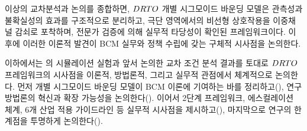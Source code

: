 
\bigskip
이상의 교차분석과 논의를 종합하면, $DRTO$ 개별 시그모이드 바운딩 모델은
관측성과 불확실성의 효과를 구조적으로 분리하고, 극단 영역에서의
비선형 상호작용을 이중채널 감쇠로 포착하며,
전문가 검증에 의해 실무적 타당성이 확인된 프레임워크이다.
이후에 이러한 이론적 발견이 BCM 실무와 정책 수립에 갖는
구체적 시사점을 논의한다.



이하에서는 의 시뮬레이션 실험과 앞서 논의한 교차 조건 분석 결과를
토대로 $DRTO$ 프레임워크의 시사점을 이론적, 방법론적, 그리고 실무적 관점에서
체계적으로 논의한다. 먼저 개별 시그모이드 바운딩 모델이 BCM 이론에
기여하는 바를 정리하고(),
연구 방법론의 혁신과 확장 가능성을 논의한다().
이어서 2단계 프레임워크, 에스컬레이션 체계, 6개 산업 적용 가이드라인 등
실무적 시사점을 제시하고(),
마지막으로 연구의 한계점을 투명하게 논의한다().
